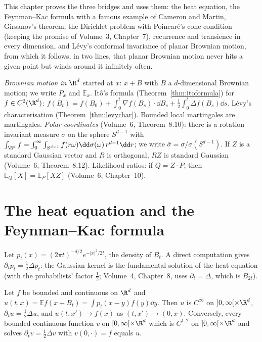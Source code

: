 This chapter proves the three bridges and uses them: the heat equation, the Feynman--Kac formula with a famous example of Cameron and Martin, Girsanov's theorem, the Dirichlet problem with Poincar\'e's
cone condition (keeping the promise of Volume~3, Chapter~7), recurrence and transience in every dimension, and L\'evy's conformal invariance of planar Brownian motion, from which it follows, in two lines,
that planar Brownian motion never hits a given point but winds around it infinitely often.

\begin{reminder}
\emph{Brownian motion in $\R^d$} started at $x$: $x+B$ with $B$ a $d$-dimensional Brownian motion; we write $P_x$ and $\mathbb E_x$. It\^o's formula (Theorem~\ref{thm:itoformula}) for $f\in C^2(\R^d)$:
$f(B_t)=f(B_0)+\int_0^t\nabla f(B_s)\cdot\dd B_s+\frac12\int_0^t\Delta f(B_s)\dd s$. L\'evy's characterisation (Theorem~\ref{thm:levychar}). Bounded local martingales are martingales. \emph{Polar coordinates}
(Volume~6, Theorem~8.10): there is a rotation invariant measure $\sigma$ on the sphere $S^{d-1}$ with $\int_{\R^d}f=\int_0^\infty\int_{S^{d-1}}f(r\omega)\dd\sigma(\omega)\,r^{d-1}\dd r$; we write $\bar\sigma=\sigma/\sigma(S^{d-1})$. If $Z$ is a
standard Gaussian vector and $R$ is orthogonal, $RZ$ is standard Gaussian (Volume~6, Theorem~8.12). Likelihood ratios: if $Q=Z\cdot P$, then $\mathbb E_Q[X]=\mathbb E_P[XZ]$ (Volume~6, Chapter~10).
\end{reminder}

\section{The heat equation and the Feynman--Kac formula}

Let $p_t(x)=(2\pi t)^{-d/2}e^{-|x|^2/2t}$, the density of $B_t$. A direct computation gives $\partial_tp_t=\frac12\Delta p_t$: the Gaussian kernel is the fundamental solution of the heat equation (with the
probabilists' factor $\frac12$; Volume~4, Chapter~8, uses $\partial_t=\Delta$, which is $B_{2t}$).

\begin{theorem}\label{thm:heat}
Let $f$ be bounded and continuous on $\R^d$ and $u(t,x)=\mathbb Ef(x+B_t)=\int p_t(x-y)f(y)\dd y$. Then $u$ is $C^\infty$ on $]0,\infty[\times\R^d$, $\partial_tu=\frac12\Delta u$, and $u(t,x')\to f(x)$ as
$(t,x')\to(0,x)$. Conversely, every bounded continuous function $v$ on $[0,\infty[\times\R^d$ which is $C^{1,2}$ on $]0,\infty[\times\R^d$ and solves $\partial_tv=\frac12\Delta v$ with $v(0,\cdot)=f$ equals $u$.
\end{theorem}

